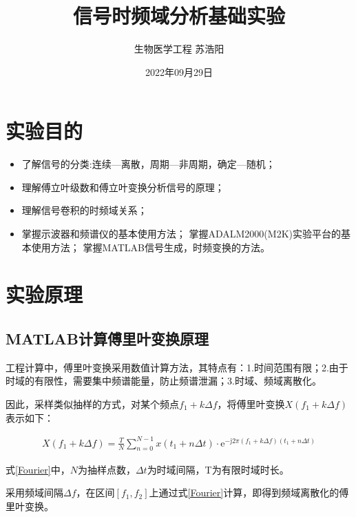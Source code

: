 \documentclass[12pt]{article}
\title{\vspace{-1.4cm}信号时频域分析基础实验}
\author{生物医学工程 \quad 苏浩阳 \quad 20300720002}
\date{2022年09月29日}
\begin{document}
\maketitle
\pagestyle{fancy}
\section{实验目的}
\begin{itemize}
\setlength{\itemsep}{0pt}
\setlength{\parsep}{0pt}
\setlength{\parskip}{0pt}
    \item 了解信号的分类:连续—离散，周期—非周期，确定—随机；
    \item 理解傅立叶级数和傅立叶变换分析信号的原理；
    \item 理解信号卷积的时频域关系；
    \item 掌握示波器和频谱仪的基本使用方法；
            掌握ADALM2000(M2K)实验平台的基本使用方法；
            掌握MATLAB信号生成，时频变换的方法。
\end{itemize}

\section{实验原理}
\subsection{MATLAB计算傅里叶变换原理}
工程计算中，傅里叶变换采用数值计算方法，其特点有：1.时间范围有限；2.由于时域的有限性，需要集中频谱能量，防止频谱泄漏；3.时域、频域离散化。

因此，采样类似抽样的方式，对某个频点$f_1+k\Delta f$，将傅里叶变换$X(f_1+k\Delta f)$表示如下：
\begin{center}
     {\setlength\abovedisplayskip{-0.8cm}
     \setlength\belowdisplayskip{-0.2cm}
    \begin{equation}
        \begin{aligned}
            X(f_1+k\Delta f)=\frac{T}{N}\sum^{N-1}_{n=0}x(t_1+n\Delta t)\cdot\mathrm{e}^{-\mathrm{j}2\pi (f_1+k\Delta f)(t_1 +n\Delta t)}          
        \end{aligned}
    \end{equation}
    }
    \label{Fourier}
\end{center}



式\ref{Fourier}中，$N$为抽样点数，$\Delta t$为时域间隔，T为有限时域时长。

采用频域间隔$\Delta f$，在区间$[f_1,f_2]$上通过式\ref{Fourier}计算，即得到频域离散化的傅里叶变换。
\end{document}
